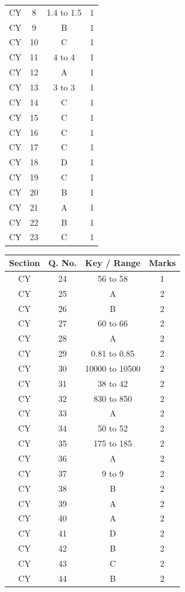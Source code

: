 \documentclass[a4paper,10pt]{exam}
\theoremstyle{remark}
\begin{document}
\begin{enumerate}
\begin{minipage}{0.49\textwidth}
\begin{tabular}{|c|c|c|c|}
CY & 8 & 1.4 to 1.5 & 1 \\
CY & 9 & B & 1 \\
CY & 10 & C & 1 \\
CY & 11 & 4 to 4 & 1 \\
CY & 12 & A & 1 \\
CY & 13 & 3 to 3 & 1 \\
CY & 14 & C & 1 \\
CY & 15 & C & 1 \\
CY & 16 & C & 1 \\
CY & 17 & C & 1 \\
CY & 18 & D & 1 \\
CY & 19 & C & 1 \\
CY & 20 & B & 1 \\
CY & 21 & A & 1 \\
CY & 22 & B & 1 \\
CY & 23 & C & 1 \\
\hline
\end{tabular}
\end{minipage}
%
\hfill
%
\begin{minipage}{0.49\textwidth}
\begin{tabular}{|c|c|c|c|}
\hline
Section & Q. No. & Key / Range & Marks \\
\hline
CY & 24 & 56 to 58 & 1 \\
CY & 25 & A & 2 \\
CY & 26 & B & 2 \\
CY & 27 & 60 to 66 & 2 \\
CY & 28 & A & 2 \\
CY & 29 & 0.81 to 0.85 & 2 \\
CY & 30 & 10000 to 10500 & 2 \\
CY & 31 & 38 to 42 & 2 \\
CY & 32 & 830 to 850 & 2 \\
CY & 33 & A & 2 \\
CY & 34 & 50 to 52 & 2 \\
CY & 35 & 175 to 185 & 2 \\
CY & 36 & A & 2 \\
CY & 37 & 9 to 9 & 2 \\
CY & 38 & B & 2 \\
CY & 39 & A & 2 \\
CY & 40 & A & 2 \\
CY & 41 & D & 2 \\
CY & 42 & B & 2 \\
CY & 43 & C & 2 \\
CY & 44 & B & 2 \\

\end{tabular}
\end{minipage}
\end{enumerate}
\end{document}
